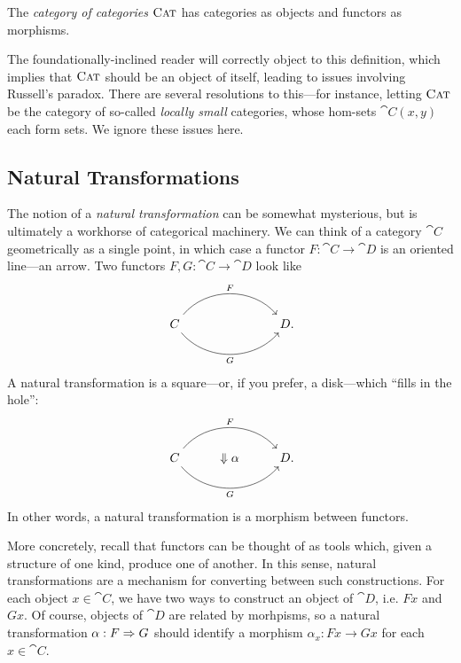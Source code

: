 \begin{dfn}
  The \emph{category of categories} ${\textsc{\text{Cat}}}$ has categories as objects and
  functors as morphisms.
\end{dfn}

The foundationally-inclined reader will correctly object to this definition,
which implies that ${\textsc{\text{Cat}}}$ should be an object of itself, leading to issues
involving Russell's paradox. There are several resolutions to this---for
instance, letting ${\textsc{\text{Cat}}}$ be the category of so-called \emph{locally small}
categories, whose hom-sets $\cat{C}(x, y)$ each form sets. We ignore these
issues here.



\subsection{Natural Transformations}

The notion of a \emph{natural transformation} can be somewhat mysterious, but is
ultimately a workhorse of categorical machinery. We can think of a category
$\cat{C}$ geometrically as a single point, in which case a functor $F:
\cat{C}\to\cat{D}$ is an oriented line---an arrow. Two functors $F,G:
\cat{C}\to\cat{D}$ look like \[
  \begin{tikzcd}
    C \ar[rr, "F", bend left=50]\ar[rr, "G"', bend right=50] & \phantom{\Downarrow\alpha} & D\punctuation{.}
  \end{tikzcd}
\]
A natural transformation is a square---or, if you prefer, a disk---which ``fills
in the hole'': \[
  \begin{tikzcd}
    C \ar[rr, "F", bend left=50]\ar[rr, "G"', bend right=50] & \Downarrow\alpha& D\punctuation{.}
  \end{tikzcd}
\]
In other words, a natural transformation is a morphism between functors.

More concretely, recall that functors can be thought of as tools which, given a
structure of one kind, produce one of another. In this sense, natural
transformations are a mechanism for converting between such constructions. For
each object $x\in\cat{C}$, we have two ways to construct an object of $\cat{D}$,
i.e. $Fx$ and $Gx$. Of course, objects of $\cat{D}$ are related by morhpisms, so
a natural transformation $\alpha: F\Rightarrow G$ should identify a morphism $\alpha_x:
Fx\to Gx$ for each $x\in\cat{C}$.

